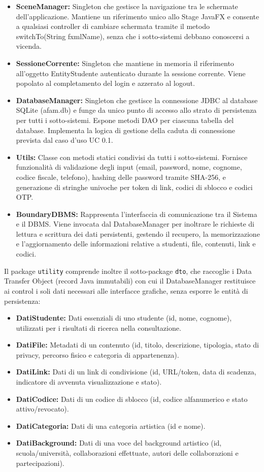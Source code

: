 \documentclass[12pt,a4paper]{article}
\begin{document}
\begin{itemize}
  \item \textbf{SceneManager:} Singleton che gestisce la navigazione tra le schermate dell'applicazione. Mantiene un riferimento unico allo Stage JavaFX e consente a qualsiasi controller di cambiare schermata tramite il metodo switchTo(String fxmlName), senza che i sotto-sistemi debbano conoscersi a vicenda.
  \item \textbf{SessioneCorrente:} Singleton che mantiene in memoria il riferimento all'oggetto EntityStudente autenticato durante la sessione corrente. Viene popolato al completamento del login e azzerato al logout.
  \item \textbf{DatabaseManager:} Singleton che gestisce la connessione JDBC al database SQLite (afam.db) e funge da unico punto di accesso allo strato di persistenza per tutti i sotto-sistemi. Espone metodi DAO per ciascuna tabella del database. Implementa la logica di gestione della caduta di connessione prevista dal caso d'uso UC 0.1.
  \item \textbf{Utils:} Classe con metodi statici condivisi da tutti i sotto-sistemi. Fornisce funzionalità di validazione degli input (email, password, nome, cognome, codice fiscale, telefono), hashing delle password tramite SHA-256, e generazione di stringhe univoche per token di link, codici di sblocco e codici OTP.
  \item \textbf{BoundaryDBMS:} Rappresenta l'interfaccia di comunicazione tra il Sistema e il DBMS. Viene invocata dal DatabaseManager per inoltrare le richieste di lettura e scrittura dei dati persistenti, gestendo il recupero, la memorizzazione e l'aggiornamento delle informazioni relative a studenti, file, contenuti, link e codici.
\end{itemize}

Il package \texttt{utility} comprende inoltre il sotto-package \texttt{dto}, che raccoglie i Data Transfer Object (record Java immutabili) con cui il DatabaseManager restituisce ai control i soli dati necessari alle interfacce grafiche, senza esporre le entità di persistenza:

\begin{itemize}
  \item \textbf{DatiStudente:} Dati essenziali di uno studente (id, nome, cognome), utilizzati per i risultati di ricerca nella consultazione.
  \item \textbf{DatiFile:} Metadati di un contenuto (id, titolo, descrizione, tipologia, stato di privacy, percorso fisico e categoria di appartenenza).
  \item \textbf{DatiLink:} Dati di un link di condivisione (id, URL/token, data di scadenza, indicatore di avvenuta visualizzazione e stato).
  \item \textbf{DatiCodice:} Dati di un codice di sblocco (id, codice alfanumerico e stato attivo/revocato).
  \item \textbf{DatiCategoria:} Dati di una categoria artistica (id e nome).
  \item \textbf{DatiBackground:} Dati di una voce del background artistico (id, scuola/università, collaborazioni effettuate, autori delle collaborazioni e partecipazioni).
\end{itemize}
\end{document}
